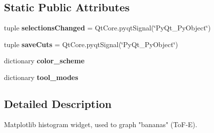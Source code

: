 \subsection*{Static Public Attributes}
\begin{DoxyCompactItemize}
\item 
\hypertarget{classWidgets_1_1MatplotlibTofeHistogramWidget_1_1MatplotlibHistogramWidget_a9d194c871a1fe890cbec217c18a30e99}{tuple {\bfseries selections\-Changed} = Qt\-Core.\-pyqt\-Signal(\char`\"{}Py\-Qt\-\_\-\-Py\-Object\char`\"{})}\label{classWidgets_1_1MatplotlibTofeHistogramWidget_1_1MatplotlibHistogramWidget_a9d194c871a1fe890cbec217c18a30e99}

\item 
\hypertarget{classWidgets_1_1MatplotlibTofeHistogramWidget_1_1MatplotlibHistogramWidget_a8b722e93581a986398d5d576ac8095fb}{tuple {\bfseries save\-Cuts} = Qt\-Core.\-pyqt\-Signal(\char`\"{}Py\-Qt\-\_\-\-Py\-Object\char`\"{})}\label{classWidgets_1_1MatplotlibTofeHistogramWidget_1_1MatplotlibHistogramWidget_a8b722e93581a986398d5d576ac8095fb}

\item 
dictionary {\bfseries color\-\_\-scheme}
\item 
dictionary {\bfseries tool\-\_\-modes}
\end{DoxyCompactItemize}


\subsection{Detailed Description}
\begin{DoxyVerb}Matplotlib histogram widget, used to graph "bananas" (ToF-E).
\end{DoxyVerb}
 

